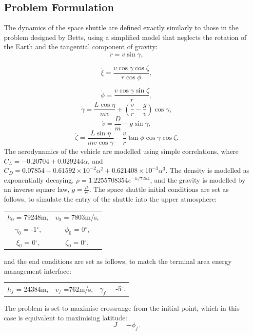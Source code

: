 \subsection{Problem Formulation}

The dynamics of the space shuttle are defined exactly similarly to those in the problem designed by Betts\cite{Betts2009}, using a simplified model that neglects the rotation of the Earth and the tangential component of gravity:
\begin{equation}
\dot{r} = v \sin \gamma,
\end{equation}

\begin{equation}
\dot{\xi} = \frac{v\cos \gamma \cos \zeta}{r \cos \phi},
\end{equation}

\begin{equation}
\dot{\phi} = \frac{v\cos\gamma\sin\zeta}{r},
\end{equation}
\begin{equation}
\dot{\gamma} = \frac{L \cos\eta}{mv} + (\frac{v}{r}-\frac{g}{v})\cos\gamma,
\end{equation}
\begin{equation}
\dot{v} = \frac{D}{m}-g\sin\gamma,
\end{equation}
\begin{equation}
\dot{\zeta} = \frac{L  \sin\eta}{mv \cos \gamma}-\frac{v}{r}\tan\phi\cos\gamma\cos\zeta.
\end{equation}
The aerodynamics of the vehicle are modelled using simple correlations, where $C_L = −0.20704 + 0.029244\alpha$, and $C_D = 0.07854 -0.61592\times10^{-2}\alpha^2 + 0.621408\times10^{-3}\alpha^3$. The density is modelled as exponentially decaying, $\rho = 1.2255708354e^{-h/7254}$, and the gravity is modelled by an inverse square law, $g = \frac{\mu}{r^2}$.
The space shuttle initial conditions are set as follows\cite{Betts2009}, to simulate the entry of the shuttle into the upper atmosphere:
\begin{table}[H]
	\centering
\begin{tabular}{c c}
  $h_0$ =  79248m, & $v_0$ = 7803m/s, \\ 
  $\gamma_0$ =  -1$^\circ$, & $\phi_0$ =  0$^\circ$,\\ 
 $\xi_0$ =  0$^\circ$, & $\zeta_0$ =  0$^\circ$,\\ 
\end{tabular} 
\end{table}
and the end conditions are set as follows\cite{Betts2009}, to match the terminal area energy management interface:
\begin{table}[H]
	\centering
	\begin{tabular}{ c c c}
		   $h_f$ =  24384m, &  $v_f$ =762m/s, & $\gamma_f$ =  -5$^\circ$.\\ 
	\end{tabular} 
\end{table}
The problem is set to maximise crossrange from the initial point, which in this case is equivalent to maximising latitude:
\begin{equation}
J = -\phi_f.
\end{equation}

